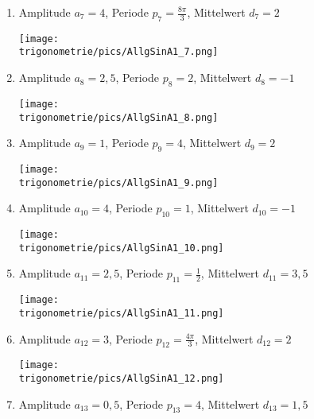 \documentclass[a4paper,12pt, headsepline, ngerman]{scrartcl}
\theoremstyle{definition}
\begin{document}
\begin{Answer}[ref=allgSinCosA1]
\begin{enumerate}[label=\alph*)]
	 \item Amplitude \(a_{7}=4\), Periode \(p_{7}=\frac{8\pi}{3}\), Mittelwert \(d_{7}=2\)\\
	 \begin{minipage}{\textwidth}
	 \texttt{[image: \\trigonometrie/pics/AllgSinA1\_7.png]}\\
	 \end{minipage}	 
	 \item Amplitude \(a_{8}=2,5\), Periode \(p_{8}=2\), Mittelwert \(d_{8}=-1\)\\
	 \begin{minipage}{\textwidth}
	 \texttt{[image: \\trigonometrie/pics/AllgSinA1\_8.png]}\\
	 \end{minipage}	\newpage
	 \item Amplitude \(a_{9}=1\), Periode \(p_{9}=4\), Mittelwert \(d_{9}=2\)\\
	 \begin{minipage}{\textwidth}
	 \texttt{[image: \\trigonometrie/pics/AllgSinA1\_9.png]}\\
	 \end{minipage}	 
	 \item Amplitude \(a_{10}=4\), Periode \(p_{10}=1\), Mittelwert \(d_{10}=-1\)\\
	 \begin{minipage}{\textwidth}
	 \texttt{[image: \\trigonometrie/pics/AllgSinA1\_10.png]}\\
	 \end{minipage}	 
	 \item Amplitude \(a_{11}=2,5\), Periode \(p_{11}=\frac{1}{2}\), Mittelwert \(d_{11}=3,5\)\\
	 \begin{minipage}{\textwidth}
	 \texttt{[image: \\trigonometrie/pics/AllgSinA1\_11.png]}\\
	 \end{minipage}	 
	 \item Amplitude \(a_{12}=3\), Periode \(p_{12}=\frac{4\pi}{3}\), Mittelwert \(d_{12}=2\)\\
	 \begin{minipage}{\textwidth}
	 \texttt{[image: \\trigonometrie/pics/AllgSinA1\_12.png]}\\
	 \end{minipage}	 \newpage
	 \item Amplitude \(a_{13}=0,5\), Periode \(p_{13}=4\), Mittelwert \(d_{13}=1,5\)\\

\end{enumerate}
\end{Answer}
\end{document}
